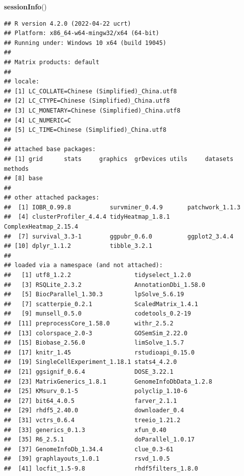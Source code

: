 \documentclass[
  12pt,
]{book}
\newenvironment{Shaded}{\begin{snugshade}}{\end{snugshade}}
\newcommand{\FunctionTok}[1]{\textcolor[rgb]{0.13,0.29,0.53}{\textbf{#1}}}
\newcommand{\NormalTok}[1]{#1}
\begin{document}
\begin{Shaded}
\begin{Highlighting}[]
\FunctionTok{sessionInfo}\NormalTok{()}
\end{Highlighting}
\end{Shaded}

\begin{verbatim}
## R version 4.2.0 (2022-04-22 ucrt)
## Platform: x86_64-w64-mingw32/x64 (64-bit)
## Running under: Windows 10 x64 (build 19045)
## 
## Matrix products: default
## 
## locale:
## [1] LC_COLLATE=Chinese (Simplified)_China.utf8 
## [2] LC_CTYPE=Chinese (Simplified)_China.utf8   
## [3] LC_MONETARY=Chinese (Simplified)_China.utf8
## [4] LC_NUMERIC=C                               
## [5] LC_TIME=Chinese (Simplified)_China.utf8    
## 
## attached base packages:
## [1] grid      stats     graphics  grDevices utils     datasets  methods  
## [8] base     
## 
## other attached packages:
##  [1] IOBR_0.99.8           survminer_0.4.9       patchwork_1.1.3      
##  [4] clusterProfiler_4.4.4 tidyHeatmap_1.8.1     ComplexHeatmap_2.15.4
##  [7] survival_3.3-1        ggpubr_0.6.0          ggplot2_3.4.4        
## [10] dplyr_1.1.2           tibble_3.2.1         
## 
## loaded via a namespace (and not attached):
##   [1] utf8_1.2.2                  tidyselect_1.2.0           
##   [3] RSQLite_2.3.2               AnnotationDbi_1.58.0       
##   [5] BiocParallel_1.30.3         lpSolve_5.6.19             
##   [7] scatterpie_0.2.1            ScaledMatrix_1.4.1         
##   [9] munsell_0.5.0               codetools_0.2-19           
##  [11] preprocessCore_1.58.0       withr_2.5.2                
##  [13] colorspace_2.0-3            GOSemSim_2.22.0            
##  [15] Biobase_2.56.0              limSolve_1.5.7             
##  [17] knitr_1.45                  rstudioapi_0.15.0          
##  [19] SingleCellExperiment_1.18.1 stats4_4.2.0               
##  [21] ggsignif_0.6.4              DOSE_3.22.1                
##  [23] MatrixGenerics_1.8.1        GenomeInfoDbData_1.2.8     
##  [25] KMsurv_0.1-5                polyclip_1.10-6            
##  [27] bit64_4.0.5                 farver_2.1.1               
##  [29] rhdf5_2.40.0                downloader_0.4             
##  [31] vctrs_0.6.4                 treeio_1.21.2              
##  [33] generics_0.1.3              xfun_0.40                  
##  [35] R6_2.5.1                    doParallel_1.0.17          
##  [37] GenomeInfoDb_1.34.4         clue_0.3-61                
##  [39] graphlayouts_1.0.1          rsvd_1.0.5                 
##  [41] locfit_1.5-9.8              rhdf5filters_1.8.0         

\end{verbatim}
\end{document}
